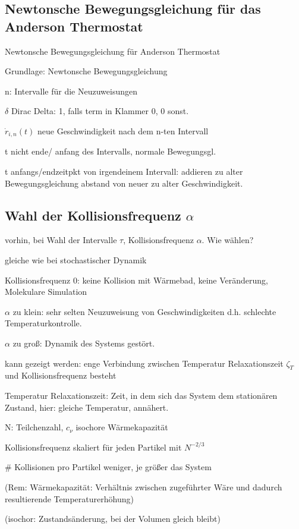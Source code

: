 \documentclass[twocolumn]{article}
\let\tempone\itemize
\let\temptwo\enditemize
\renewenvironment{itemize}{\tempone\addtolength{\itemsep}{-.5\baselineskip}}{\temptwo}
\begin{document}
\subsection{Newtonsche Bewegungsgleichung für das Anderson Thermostat}
	\begin{itemize}
		\item Newtonsche Bewegungsgleichung für Anderson Thermostat
		\item Grundlage: Newtonsche Bewegungsgleichung 
		\item n: Intervalle für die Neuzuweisungen
		\item $\delta$ Dirac Delta: 1, falls term in Klammer 0, 0 sonst. 
		\item $\dot{r}_{i,n}(t) $  neue Geschwindigkeit nach dem n-ten Intervall
		\item t nicht ende/ anfang des Intervalls, normale Bewegungsgl.
		\item t anfangs/endzeitpkt von irgendeinem Intervall: addieren zu alter Bewegungsgleichung abstand von neuer zu alter Geschwindigkeit.  
	\end{itemize}
	
\subsection{Wahl der Kollisionsfrequenz $\alpha$}
	\begin{itemize}
		\item vorhin, bei Wahl der Intervalle $\tau$, Kollisionsfrequenz $\alpha$. Wie wählen?  
		\item gleiche wie bei stochastischer Dynamik
		\item Kollisionsfrequenz 0: keine Kollision mit Wärmebad, keine Veränderung, Molekulare Simulation
		\item  $\alpha $ zu klein: sehr selten Neuzuweisung von Geschwindigkeiten d.h. schlechte Temperaturkontrolle. 
		\item $\alpha$ zu groß: Dynamik des Systems gestört.
		\item kann gezeigt werden: enge Verbindung zwischen Temperatur Relaxationszeit $ \zeta_T$ und Kollisionsfrequenz besteht
		\item Temperatur Relaxationszeit: Zeit, in dem sich das System dem stationären Zustand, hier: gleiche Temperatur, annähert.  
		\item N: Teilchenzahl, $c_\nu$ isochore Wärmekapazität
		\item Kollisionsfrequenz skaliert für jeden Partikel mit $N^{-2/3}$
		\item \# Kollisionen pro Partikel weniger, je größer das System
		\item (Rem: Wärmekapazität: Verhältnis zwischen zugeführter Wäre und dadurch resultierende Temperaturerhöhung) 
		\item (isochor: Zustandsänderung, bei der Volumen gleich bleibt)
	\end{itemize}
	
\end{document}
